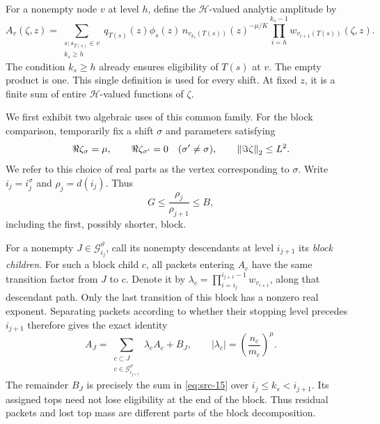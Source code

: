 For a nonempty node $v$ at level $h$, define the $\mathcal H$-valued
analytic amplitude by
\begin{equation}
 A_v(\zeta,z)
 =\sum_{\substack{s:s_{T(s)}\in v\\ k_s\ge h}}
 q_{T(s)}(z)\phi_s(z)\,
 n_{v_{k_s}(T(s))}(z)^{-\mu/K}
 \prod_{i=h}^{k_s-1}w_{v_{i+1}(T(s))}(\zeta,z).
 \label{eq:src-15}
\end{equation}
The condition $k_s\ge h$ already ensures eligibility of $T(s)$ at $v$.
The empty product is one.  This single definition is used for every
shift.  At fixed $z$, it is a finite sum of entire $\mathcal H$-valued
functions of $\zeta$.

We first exhibit two algebraic uses of this common family.  For the block
comparison, temporarily fix a shift $\sigma$ and parameters satisfying
\begin{equation}
 \Re\zeta_\sigma=\mu,
 \qquad \Re\zeta_{\sigma'}=0\quad(\sigma'\ne\sigma),
 \qquad \left\|\Im\zeta\right\|_2\le L^2.
 \label{hier:vertex-parameters}
\end{equation}
We refer to this choice of real parts as the vertex corresponding to
$\sigma$.  Write
$i_j=i_j^\sigma$ and $\rho_j=d(i_j)$.  Thus
\begin{equation}
 G\le\frac{\rho_j}{\rho_{j+1}}\le B,
 \label{hier:block-ratio}
\end{equation}
including the first, possibly shorter, block.

For a nonempty $J\in\mathcal G_{i_j}^\vartheta$, call its nonempty
descendants at level $i_{j+1}$ its \emph{block children}.  For such a block child $c$,
all packets entering $A_c$ have the same transition factor from $J$ to
$c$.  Denote it by
$\lambda_c=\prod_{i=i_j}^{i_{j+1}-1}w_{v_{i+1}}$, along that descendant
path.  Only the last transition of this block has a nonzero real
exponent.  Separating packets according to whether their stopping level
precedes $i_{j+1}$ therefore gives the exact identity
\begin{equation}
 A_J=\sum_{\substack{c\subset J\\c\in\mathcal G_{i_{j+1}}^\vartheta}}
                 \lambda_c A_c+B_J,
 \qquad
 |\lambda_c|=\left(\frac{n_c}{m_c}\right)^\mu.
 \label{eq:src-18}
\end{equation}
The remainder $B_J$ is precisely the sum in \eqref{eq:src-15} over
$i_j\le k_s<i_{j+1}$.  Its assigned tops need not lose eligibility at
the end of the block.  Thus residual packets and lost top mass are
different parts of the block decomposition.

